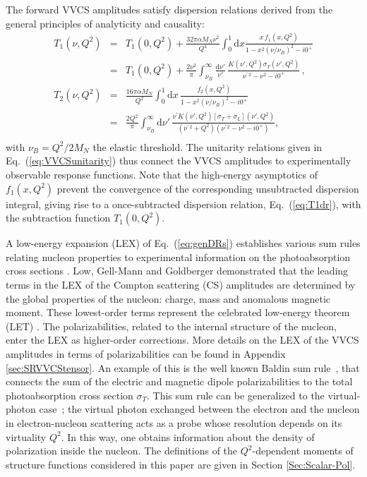 \documentclass[11pt,preprint,tightenlines,
showpacs,preprintnumbers,amsmath,amssymb,superscriptaddress,a4paper,nofootinbib]{revtex4-1}
\def\bea{\begin{eqnarray}}
\def\eea{\end{eqnarray}}
\def\eqlab#1{\label{eq:#1}}
\def\Eqref#1{Eq.~(\ref{eq:#1})}
\def\al{\alpha}
\def\si{\sigma} \def\Si{{\it\Sigma}}
\def\dd{\mathrm{d}}
\begin{document}
The forward VVCS amplitudes satisfy dispersion relations derived from the general principles of analyticity and causality:
\begin{subequations}
\eqlab{genDRs}
\bea 
T_1 ( \nu, Q^2) &=&T_1(0,Q^2) + \frac{32\pi\al M_N\nu^2}{Q^4} \int_{0}^1 
\!\dd x 
\frac{x\, f_1 (x, Q^2)}{1 - x^2 (\nu/\nu_{B})^2 - i 0^+} \nonumber\\ 
&=& T_1(0,Q^2) + \frac{2\nu^2}{\pi } \int_{\nu_{B}}^\infty\! \frac{\dd \nu'}{\nu'} \, 
\frac{K(\nu',Q^2)\si_T ( \nu', Q^2)}{\nu^{\prime\,2} -\nu^2 - i 0^+}\,,\eqlab{T1dr}\\
T_2 ( \nu, Q^2) &=& \frac{16\pi\al M_N}{Q^2} \int_{0}^1 
\!\dd x\, 
\frac{f_2 (x, Q^2)}{1 - x^2 (\nu/\nu_{B})^2  - i 0^+} \nonumber \\
&=&\frac{2Q^2}{\pi} \int_{\nu_{B}}^\infty\! \dd \nu' \, 
\frac{\nu^{\prime}K(\nu',Q^2)[ \si_T+\si_L] ( \nu', Q^2)}{(\nu^{\prime\,2}+Q^2)(\nu^{\prime\,2} -\nu^2- i 0^+)} \eqlab{T2dr},\\
\eea 
\eqlab{SRgen}
\end{subequations}
with $\nu_{B}=Q^2/2M_N$ the elastic threshold. The unitarity relations given in \Eqref{VVCSunitarity}
thus connect the VVCS amplitudes to experimentally observable response functions. Note that the high-energy asymptotics of $f_1(x,Q^2)$ prevent the convergence of the corresponding unsubtracted dispersion integral,
giving rise to a once-subtracted dispersion relation, \Eqref{T1dr}, with the subtraction function $T_1(0,Q^2)$. 

A low-energy expansion (LEX) of \Eqref{genDRs} establishes various sum rules relating nucleon properties to experimental information on the photoabsorption cross sections \cite{Drechsel:2002ar,Hagelstein:2015egb}.
Low, Gell-Mann and Goldberger \cite{ Low:1954kd, Gell_Mann:1954kc} demonstrated that the leading terms in the LEX of the Compton scattering (CS) amplitudes are determined by the global properties of the nucleon: charge, mass and anomalous magnetic moment. These lowest-order terms represent the celebrated low-energy theorem (LET) \cite{Low:1954kd, Gell_Mann:1954kc}.
The polarizabilities, related to the internal structure of the nucleon,
enter the LEX as higher-order corrections. More details on the LEX of the VVCS amplitudes in terms of polarizabilities can be found in Appendix \ref{sec:SRVVCStensor}. 
An example of this is the well known Baldin sum rule~\cite{Baldin:1960}, that connects the sum of the electric and magnetic dipole polarizabilities
to the total photoabsorption cross section $\sigma_T$.
This sum rule can be generalized to the virtual-photon case~\cite{Drechsel:2002ar};
the virtual photon exchanged between the electron and the nucleon
in electron-nucleon scattering acts as a probe whose resolution depends on its virtuality $Q^2$.
In this way, one obtains information about the density of polarization inside the nucleon.
The definitions of the $Q^2$-dependent moments of structure functions considered in this paper are given in Section \ref{Sec:Scalar-Pol}.
\end{document}
